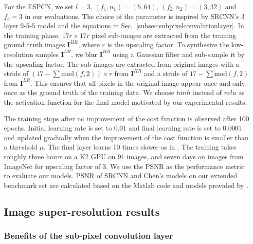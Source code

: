 \documentclass[10pt,twocolumn,letterpaper]{article}
\newcommand{\Mod}[2]{\text{mod}\left(#1,#2\right)}
\begin{document}
For the \ac{ESPCN}, we set $l = 3$, $(f_1, n_1) = (5, 64)$, $(f_2, n_2) = (3, 32)$ and $f_3 = 3$ in our evaluations. The choice of the parameter is inspired by SRCNN's 3 layer 9-5-5 model and the equations in Sec.~\ref{subsec:subpixelconvolutionlayer}. In the training phase, $17r \times 17r$ pixel sub-images are extracted from the training ground truth images $\mathbf{I}^{HR}$, where $r$ is the upscaling factor. To synthesize the low-resolution samples $\mathbf{I}^{LR}$, we blur $\mathbf{I}^{HR}$ using a Gaussian filter and sub-sample it by the upscaling factor. The sub-images are extracted from original images with a stride of $(17 - \sum{\Mod{f}{2}})\times r$ from $\mathbf{I}^{HR}$ and a stride of $17 - \sum{\Mod{f}{2}}$ from $\mathbf{I}^{LR}$. This ensures that all pixels in the original image appear once and only once as the ground truth of the training data. We choose $tanh$ instead of $relu$ as the activation function for the final model motivated by our experimental results.

The training stops after no improvement of the cost function is observed after 100 epochs. Initial learning rate is set to 0.01 and final learning rate is set to 0.0001 and updated gradually when the improvement of the cost function is smaller than a threshold $\mu$. The final layer learns 10 times slower as in \cite{dong2015image}. The training takes roughly three hours on a K2 GPU on 91 images, and seven days on images from ImageNet \cite{russakovsky2014imagenet} for upscaling factor of 3. We use the \ac{PSNR} as the performance metric to evaluate our models. \ac{PSNR} of SRCNN and Chen's models on our extended benchmark set are calculated based on the Matlab code and models provided by \cite{dong2015image,chen2015trainable}.

\subsection{Image super-resolution results}

\subsubsection{Benefits of the sub-pixel convolution layer}
\end{document}
